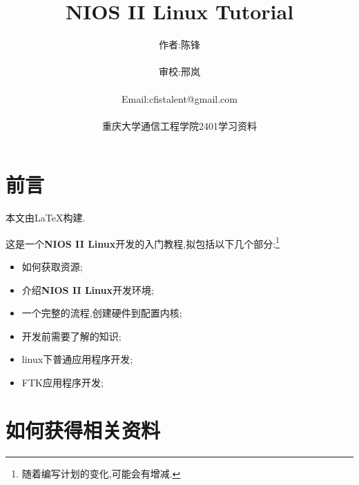 \documentclass[12pt,a4paper,titlepage]{article}
\title{NIOS II Linux Tutorial}
\author{作者:陈锋\\\\审校:邢岚\\\\Email:cfistalent@gmail.com\\\\重庆大学通信工程学院2401学习资料}
\begin{document}
\thispagestyle{empty}
\maketitle{}
\section{前言}
\setcounter{footnote}{0}
本文由\LaTeX{}构建.

这是一个\textbf{NIOS II Linux}开发的入门教程,拟包括以下几个部分:\footnote{随着编写计划的变化,可能会有增减.}
\begin{itemize}
\item 如何获取资源;
\item 介绍\textbf{NIOS II Linux}开发环境;
\item 一个完整的流程,创建硬件到配置内核;
\item 开发前需要了解的知识;
\item linux下普通应用程序开发;
\item FTK应用程序开发;
\end{itemize}
\newpage{}
\section{如何获得相关资料}
\setcounter{footnote}{0}
\end{document}

